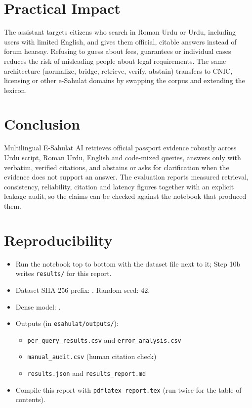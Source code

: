 \documentclass[12pt,a4paper]{article}
\begin{document}
\section{Practical Impact}
The assistant targets citizens who search in Roman Urdu or Urdu, including users with limited English, and gives them
official, citable answers instead of forum hearsay. Refusing to guess about fees, guarantees or individual cases reduces the
risk of misleading people about legal requirements. The same architecture (normalize, bridge, retrieve, verify, abstain)
transfers to CNIC, licensing or other e-Sahulat domains by swapping the corpus and extending the lexicon.

\section{Conclusion}
Multilingual E-Sahulat AI retrieves official passport evidence robustly across Urdu script, Roman Urdu, English and
code-mixed queries, answers only with verbatim, verified citations, and abstains or asks for clarification when the
evidence does not support an answer. The evaluation reports measured retrieval, consistency, reliability, citation and
latency figures together with an explicit leakage audit, so the claims can be checked against the notebook that produced
them.

\appendix
\section{Reproducibility}
\begin{itemize}
  \item Run the notebook top to bottom with the dataset file next to it; Step 10b writes \texttt{results/} for this report.
  \item Dataset SHA-256 prefix: \texttt{\RDatasetHash}. Random seed: 42.
  \item Dense model: \RDenseModel.
  \item Outputs (in \texttt{esahulat/outputs/}):
  \begin{itemize}
    \item \texttt{per\_query\_results.csv} and \texttt{error\_analysis.csv}
    \item \texttt{manual\_audit.csv} (human citation check)
    \item \texttt{results.json} and \texttt{results\_report.md}
  \end{itemize}
  \item Compile this report with \texttt{pdflatex report.tex} (run twice for the table of contents).
\end{itemize}
\end{document}
